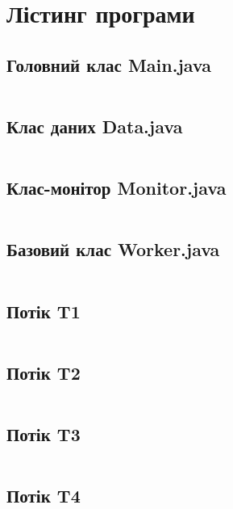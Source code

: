 \documentclass[12pt,a4paper]{article}
\begin{document}
\clearpage
\appendix
\section{Лістинг програми}
\subsection{Головний клас Main.java}
\inputminted{java}{../src/Main.java}
\subsection{Клас даних Data.java}
\inputminted{java}{../src/Data.java}
\subsection{Клас-монітор Monitor.java}
\inputminted{java}{../src/Monitor.java}
\subsection{Базовий клас Worker.java}
\inputminted{java}{../src/Worker.java}
\subsection{Потік T1}
\inputminted{java}{../src/T1.java}
\subsection{Потік T2}
\inputminted{java}{../src/T2.java}
\subsection{Потік T3}
\inputminted{java}{../src/T3.java}
\subsection{Потік T4}
\inputminted{java}{../src/T4.java}
\end{document}
